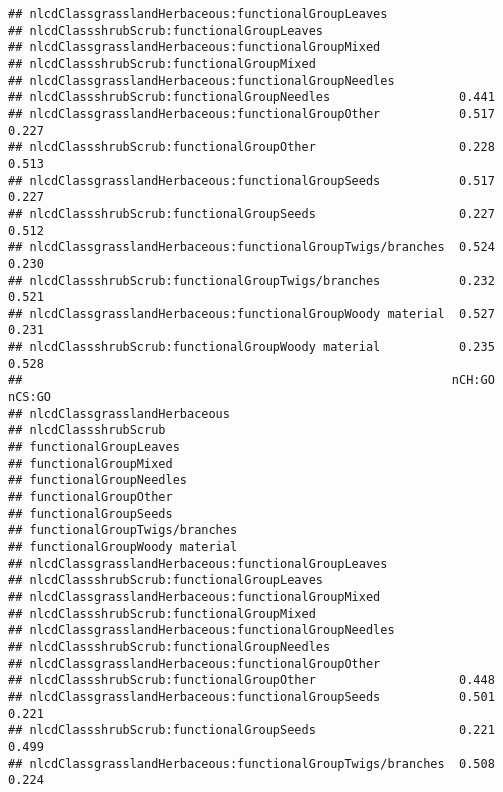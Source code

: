 \documentclass[]{article}
\begin{document}
\begin{verbatim}
## nlcdClassgrasslandHerbaceous:functionalGroupLeaves                      
## nlcdClassshrubScrub:functionalGroupLeaves                               
## nlcdClassgrasslandHerbaceous:functionalGroupMixed                       
## nlcdClassshrubScrub:functionalGroupMixed                                
## nlcdClassgrasslandHerbaceous:functionalGroupNeedles                     
## nlcdClassshrubScrub:functionalGroupNeedles                  0.441       
## nlcdClassgrasslandHerbaceous:functionalGroupOther           0.517  0.227
## nlcdClassshrubScrub:functionalGroupOther                    0.228  0.513
## nlcdClassgrasslandHerbaceous:functionalGroupSeeds           0.517  0.227
## nlcdClassshrubScrub:functionalGroupSeeds                    0.227  0.512
## nlcdClassgrasslandHerbaceous:functionalGroupTwigs/branches  0.524  0.230
## nlcdClassshrubScrub:functionalGroupTwigs/branches           0.232  0.521
## nlcdClassgrasslandHerbaceous:functionalGroupWoody material  0.527  0.231
## nlcdClassshrubScrub:functionalGroupWoody material           0.235  0.528
##                                                            nCH:GO nCS:GO
## nlcdClassgrasslandHerbaceous                                            
## nlcdClassshrubScrub                                                     
## functionalGroupLeaves                                                   
## functionalGroupMixed                                                    
## functionalGroupNeedles                                                  
## functionalGroupOther                                                    
## functionalGroupSeeds                                                    
## functionalGroupTwigs/branches                                           
## functionalGroupWoody material                                           
## nlcdClassgrasslandHerbaceous:functionalGroupLeaves                      
## nlcdClassshrubScrub:functionalGroupLeaves                               
## nlcdClassgrasslandHerbaceous:functionalGroupMixed                       
## nlcdClassshrubScrub:functionalGroupMixed                                
## nlcdClassgrasslandHerbaceous:functionalGroupNeedles                     
## nlcdClassshrubScrub:functionalGroupNeedles                              
## nlcdClassgrasslandHerbaceous:functionalGroupOther                       
## nlcdClassshrubScrub:functionalGroupOther                    0.448       
## nlcdClassgrasslandHerbaceous:functionalGroupSeeds           0.501  0.221
## nlcdClassshrubScrub:functionalGroupSeeds                    0.221  0.499
## nlcdClassgrasslandHerbaceous:functionalGroupTwigs/branches  0.508  0.224

\end{verbatim}
\end{document}
